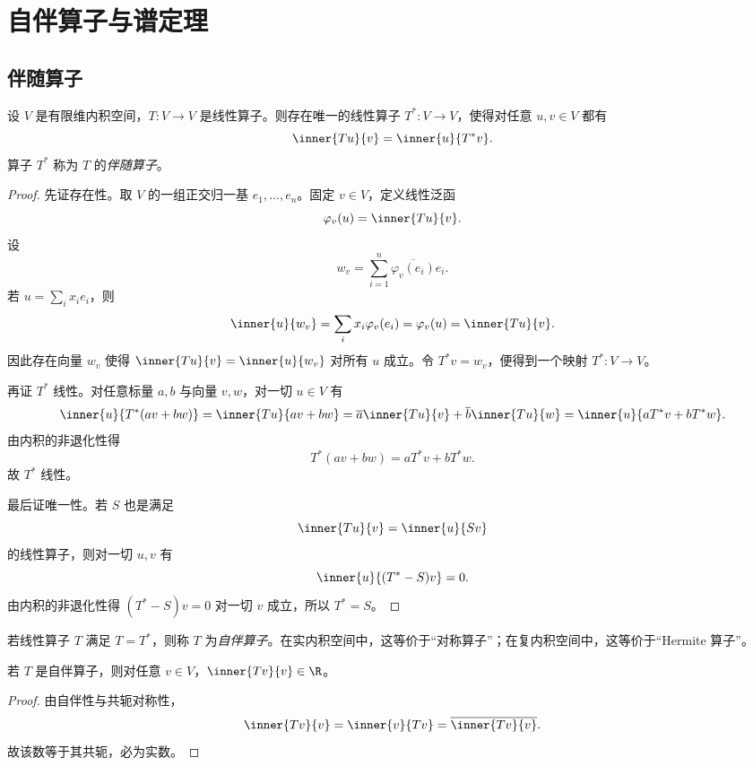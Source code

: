 \section{自伴算子与谱定理}

\subsection{伴随算子}

\begin{theorem}
设 $V$ 是有限维内积空间，$T:V\to V$ 是线性算子。则存在唯一的线性算子 $T^*:V\to V$，使得对任意 $u,v\in V$ 都有
\[
\inner{Tu}{v}=\inner{u}{T^*v}.
\]
算子 $T^*$ 称为 $T$ 的\emph{伴随算子}。
\end{theorem}

\begin{proof}
先证存在性。取 $V$ 的一组正交归一基 $e_1,\dots,e_n$。固定 $v\in V$，定义线性泛函
\[
\varphi_v(u)=\inner{Tu}{v}.
\]
设
\[
w_v=\sum_{i=1}^n \overline{\varphi_v(e_i)}e_i.
\]
若 $u=\sum_i x_ie_i$，则
\[
\inner{u}{w_v}=\sum_i x_i\varphi_v(e_i)=\varphi_v(u)=\inner{Tu}{v}.
\]
因此存在向量 $w_v$ 使得 $\inner{Tu}{v}=\inner{u}{w_v}$ 对所有 $u$ 成立。令 $T^*v=w_v$，便得到一个映射 $T^*:V\to V$。

再证 $T^*$ 线性。对任意标量 $a,b$ 与向量 $v,w$，对一切 $u\in V$ 有
\[
\inner{u}{T^*(av+bw)}=\inner{Tu}{av+bw}=\overline{a}\inner{Tu}{v}+\overline{b}\inner{Tu}{w}
=\inner{u}{aT^*v+bT^*w}.
\]
由内积的非退化性得
\[
T^*(av+bw)=aT^*v+bT^*w.
\]
故 $T^*$ 线性。

最后证唯一性。若 $S$ 也是满足
\[
\inner{Tu}{v}=\inner{u}{Sv}
\]
的线性算子，则对一切 $u,v$ 有
\[
\inner{u}{(T^*-S)v}=0.
\]
由内积的非退化性得 $(T^*-S)v=0$ 对一切 $v$ 成立，所以 $T^*=S$。
\end{proof}

\begin{definition}
若线性算子 $T$ 满足 $T=T^*$，则称 $T$ 为\emph{自伴算子}。在实内积空间中，这等价于“对称算子”；在复内积空间中，这等价于“Hermite 算子”。
\end{definition}

\begin{proposition}
若 $T$ 是自伴算子，则对任意 $v\in V$，$\inner{Tv}{v}\in\R$。
\end{proposition}

\begin{proof}
由自伴性与共轭对称性，
\[
\inner{Tv}{v}=\inner{v}{Tv}=\overline{\inner{Tv}{v}}.
\]
故该数等于其共轭，必为实数。
\end{proof}

